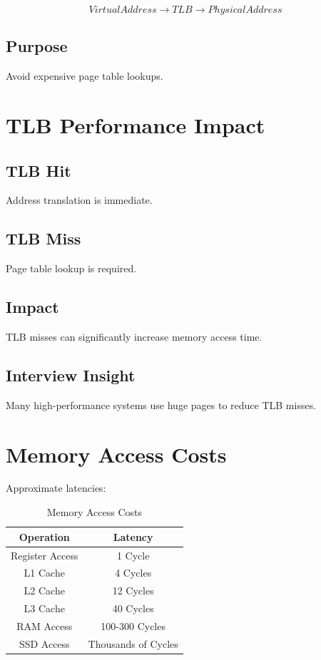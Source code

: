 \[
Virtual Address
\rightarrow
TLB
\rightarrow
Physical Address
\]

\subsection{Purpose}

Avoid expensive page table lookups.

\section{TLB Performance Impact}

\subsection{TLB Hit}

Address translation is immediate.

\subsection{TLB Miss}

Page table lookup is required.

\subsection{Impact}

TLB misses can significantly increase memory access time.

\subsection{Interview Insight}

Many high-performance systems use huge pages to reduce TLB misses.

\section{Memory Access Costs}

Approximate latencies:

\begin{table}[h]
\centering
\begin{tabular}{|c|c|}
\hline
Operation & Latency \\
\hline
Register Access & 1 Cycle \\
L1 Cache & 4 Cycles \\
L2 Cache & 12 Cycles \\
L3 Cache & 40 Cycles \\
RAM Access & 100-300 Cycles \\
SSD Access & Thousands of Cycles \\
\hline
\end{tabular}
\caption{Memory Access Costs}
\end{table}

